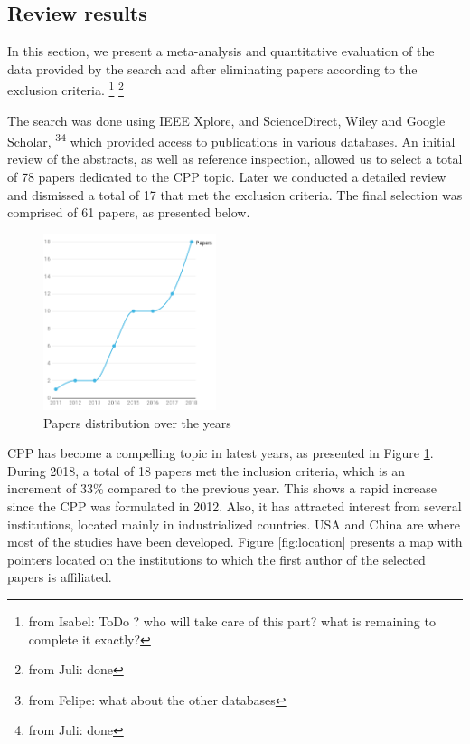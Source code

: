 \documentclass{IEEEtran}
\newcommand\fia[1]{{\color{red}\footnote{\color{red}from Isabel: #1}}} %
\newcommand\dia[1]{{\color{blue}\footnote{\color{blue}from Felipe: #1}}}
\newcommand\juli[1]{{\color{magenta}\footnote{\color{magenta}from Juli: #1}}}
\begin{document}
\subsection{Review results}
In this section, we present a meta-analysis and quantitative evaluation of the data provided by the search and after eliminating papers according to the exclusion criteria. \fia{ToDo ? who will take care of this part? what is remaining to complete it exactly?} \juli{done}


The search was done using IEEE Xplore, and ScienceDirect, Wiley and Google Scholar, \dia{what about the other databases}\juli{done} which provided access to publications in various databases. An initial review of the abstracts, as well as reference inspection,  allowed us to select a total of 78 papers dedicated to the CPP topic. Later we conducted a detailed review and dismissed a total of 17 that met the exclusion criteria. The final selection was comprised of 61 papers, as presented below.

\begin{figure}
    \centering
    \includegraphics[width=0.45\textwidth]{Pictures/years.png}
    \caption{Papers distribution over the years}
    \label{fig:years}
\end{figure}

CPP has become a compelling topic in latest years, as presented in Figure \ref{fig:years}. During 2018, a total of 18 papers met the inclusion criteria, which is an increment of 33\% compared to the previous year. This shows a rapid increase since the CPP was formulated in 2012. Also, it has attracted interest from several institutions, located mainly in industrialized countries. USA and China are where most of the studies have been developed. Figure \ref{fig:location} presents a map with pointers located on the institutions to which the first author of the selected papers is affiliated. 
\end{document}
